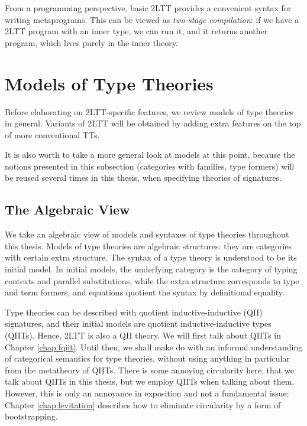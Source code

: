 \documentclass[12pt,a4paper,twoside,openany]{book}
\theoremstyle{remark}
\theoremstyle{definition}
\theoremstyle{theorem}
\begin{document}
From a programming perspective, basic 2LTT provides a convenient syntax for
writing metaprograms. This can be viewed as \emph{two-stage compilation}: if we
have a 2LTT program with an inner type, we can run it, and it returns another
program, which lives purely in the inner theory.

\section{Models of Type Theories}
\label{sec:models-of-tts}

Before elaborating on 2LTT-specific features, we review models of type theories
in general. Variants of 2LTT will be obtained by adding extra features on the
top of more conventional TTs.

It is also worth to take a more general look at models at this point, because
the notions presented in this subsection (categories with families, type
formers) will be reused several times in this thesis, when specifying theories
of signatures.

\subsection{The Algebraic View}

We take an algebraic view \cite{TODO} of models and syntaxes of type theories throughout
this thesis. Models of type theories are algebraic structures: they are
categories with certain extra structure. The syntax of a type theory is
understood to be its initial model. In initial models, the underlying category
is the category of typing contexts and parallel substitutions, while the extra
structure corresponds to type and term formers, and equations quotient the
syntax by definitional equality.

Type theories can be described with quotient inductive-inductive (QII)
signatures, and their initial models are quotient inductive-inductive types
(QIITs). Hence, 2LTT is also a QII theory. We will first talk about QIITs in
Chapter \ref{chap:fqiit}. Until then, we shall make do with an informal
understanding of categorical semantics for type theories, without using anything
in particular from the metatheory of QIITs. There is some annoying circularity
here, that we talk about QIITs in this thesis, but we employ QIITs when talking
about them. However, this is only an annoyance in exposition and not a
fundamental issue: Chapter \ref{chap:levitation} describes how to eliminate
circularity by a form of bootstrapping.
\end{document}
